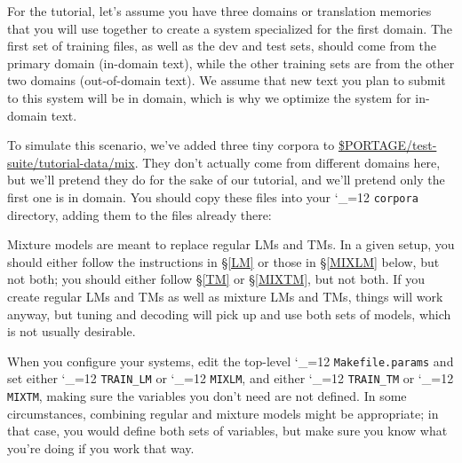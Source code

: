 \documentclass[11pt,letterpaper]{article}
\def\code{\begingroup\catcode`\_=12 \codex}
\newcommand{\codex}[1]{\texttt{#1}\endgroup}
\begin{document}
For the tutorial, let's assume
you have three domains or translation memories that you will use
together to create a system specialized for the first domain.  The first set of
training files, as well as the dev and test sets, should come from the primary
domain (in-domain text), while the other training sets are from the other two
domains (out-of-domain text).  We assume that new text you plan to submit to
this system will be in domain, which is why we optimize the system for
in-domain text.

To simulate this scenario, we've added three tiny corpora to
\url{$PORTAGE/test-suite/tutorial-data/mix}.
They don't actually come from different domains here, but we'll pretend they do
for the sake of our tutorial, and we'll pretend only the first one is in
domain.  You should copy these files into your \code{corpora} directory, adding
them to the files already there:

Mixture models are meant to replace regular LMs and TMs. In a given setup, you
should either follow the instructions in \S\ref{LM} or those in \S\ref{MIXLM}
below, but not both; you should either follow \S\ref{TM} or \S\ref{MIXTM}, but
not both.  If you create regular LMs and
TMs as well as mixture LMs and TMs, things will work anyway, but tuning and
decoding will pick up and use both sets of models, which is not usually
desirable.

When you configure your systems, edit the top-level \code{Makefile.params} and
set either \code{TRAIN_LM} or \code{MIXLM}, and either \code{TRAIN_TM} or
\code{MIXTM}, making sure the variables you don't need are not defined. In some
circumstances, combining regular and mixture models might be appropriate; in
that case, you would define both sets of variables, but make sure you know what
you're doing if you work that way.
\end{document}
